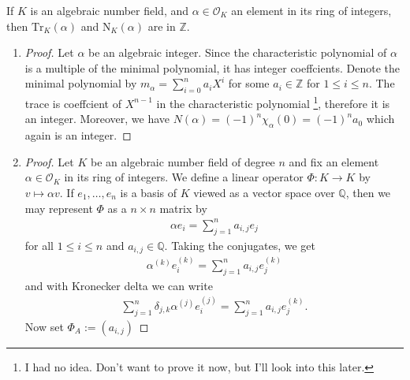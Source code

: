 \begin{thmbox}
    \begin{lemma}
        If \(K\) is an algebraic number field, and \(\alpha \in \mathcal{O}_K\) an element in its ring of integers, then \(\mathrm{Tr}_K(\alpha)\) and \(\mathrm{N}_K(\alpha)\) are in \(\mathbb{Z}\).
    \end{lemma}
\end{thmbox}
\begin{enumerate}
    \item \begin{proof} Let \(\alpha\) be an algebraic integer. Since the characteristic polynomial of \(\alpha\) is a multiple of the minimal polynomial, it has integer coeffcients. Denote the minimal polynomial by \(m_\alpha = \sum_{i=0}^n a_i X^i\) for some \(a_i \in \mathbb{Z}\) for \(1 \leq i \leq n\). The trace is coeffcient of \(X^{n-1}\) in the characteristic polynomial \footnote{I had no idea. Don't want to prove it now, but I'll look into this later.}, therefore it is an integer. Moreover, we have \(N(\alpha) = (-1)^n \chi_\alpha(0) = (-1)^n a_0\) which again is an integer.
    \end{proof}
    \item \begin{proof}
        Let \(K\) be an algebraic number field of degree \(n\) and fix an element \(\alpha \in \mathcal{O}_K\) in its ring of integers. We define a linear operator \(\Phi: K \longrightarrow K\) by \(v \mapsto \alpha v\). If \(e_1, \ldots, e_n\) is a basis of \(K\) viewed as a vector space over \(\mathbb{Q}\), then we may represent \(\Phi\) as a \(n \times n\) matrix by
        \begin{align*}
            \alpha e_i = \sum_{j=1}^n a_{i, j} e_j
        \end{align*}
        for all \(1 \leq i \leq n\) and \(a_{i, j} \in \mathbb{Q}\). Taking the conjugates, we get
        \begin{align*}
            \alpha^{(k)} e_i^{(k)} = \sum_{j=1}^n a_{i, j} e_j^{(k)}
        \end{align*}
        and with Kronecker delta we can write
        \begin{align*}
            \sum_{j=1}^n \delta_{j, k} \alpha^{(j)} e_i^{(j)} = \sum_{j=1}^n a_{i, j} e_j^{(k)} \text{.}
        \end{align*}
        Now set \(\Phi_A := (a_{i, j})\)
    \end{proof}
\end{enumerate}

